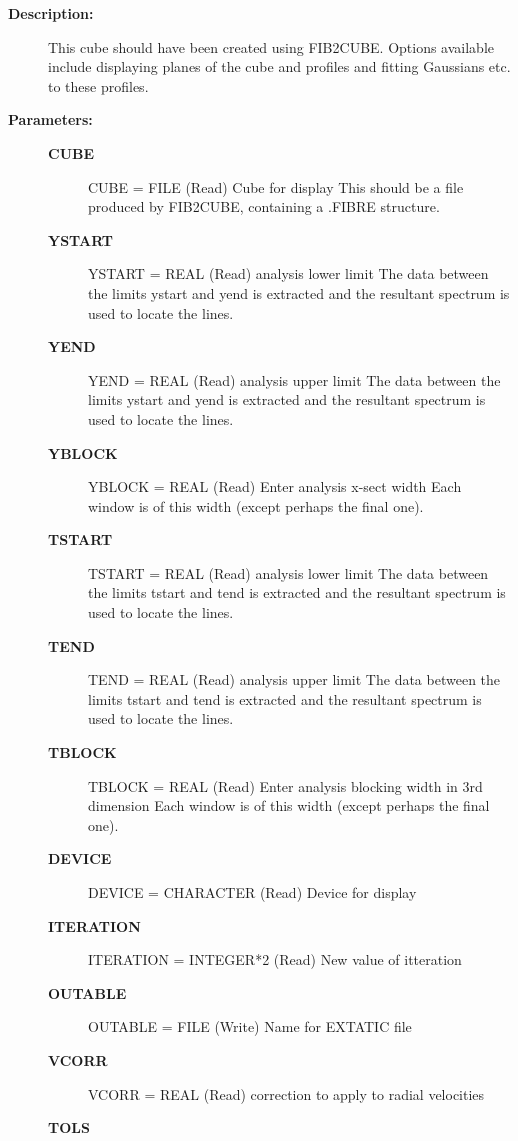 \begin{description}
\begin{description}
\item [\textbf{Description:}]
    This cube should have been created using FIB2CUBE. Options available
    include displaying planes of the cube and profiles and fitting
    Gaussians etc. to these profiles.

\item [\textbf{Parameters:}]
\begin{description}
\item [\textbf{CUBE}]
    CUBE = FILE (Read)
        Cube for display
          This should be a file produced by FIB2CUBE, containing
          a .FIBRE structure.
\item [\textbf{YSTART}]
    YSTART = REAL (Read)
        analysis lower limit
            The data between the limits ystart and yend is extracted
            and the resultant spectrum is used to locate the lines.
\item [\textbf{YEND}]
    YEND = REAL (Read)
        analysis upper limit
            The data between the limits ystart and yend is extracted
            and the resultant spectrum is used to locate the lines.
\item [\textbf{YBLOCK}]
    YBLOCK = REAL (Read)
        Enter analysis x-sect width
            Each window is of this width (except perhaps the final one).
\item [\textbf{TSTART}]
    TSTART = REAL (Read)
        analysis lower limit
            The data between the limits tstart and tend is extracted
            and the resultant spectrum is used to locate the lines.
\item [\textbf{TEND}]
    TEND = REAL (Read)
        analysis upper limit
            The data between the limits tstart and tend is extracted
            and the resultant spectrum is used to locate the lines.
\item [\textbf{TBLOCK}]
    TBLOCK = REAL (Read)
        Enter analysis blocking width in 3rd dimension
            Each window is of this width (except perhaps the final one).
\item [\textbf{DEVICE}]
    DEVICE = CHARACTER (Read)
        Device for display
\item [\textbf{ITERATION}]
    ITERATION = INTEGER*2 (Read)
        New value of itteration
\item [\textbf{OUTABLE}]
    OUTABLE = FILE (Write)
        Name for EXTATIC file
\item [\textbf{VCORR}]
    VCORR = REAL (Read)
        correction to apply to radial velocities
\item [\textbf{TOLS}]

\end{description}
\end{description}
\end{description}
